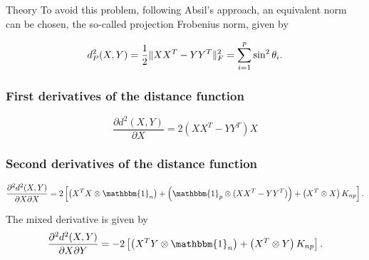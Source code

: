 \begin{chapter}{Theory}
To avoid this problem, following Absil's \cite{AbsilGrassmann} approach, an equivalent norm can be chosen, the so-called projection Frobenius norm, given by

\begin{equation}
    d_P^2(X,Y) = \frac{1}{2}\| XX^T-YY^T \|_{F}^{2} = \sum_{i=1}^p\sin^2\theta_i.
\end{equation}




\subsubsection{First derivatives of the distance function} %
\label{ssub:First derivatives of the distance function}

\begin{equation}
    \label{eq:gr_x_der}
    \frac{\partial d^2(X,Y)}{\partial X} = 2\left(XX^T-YY^T\right)X
\end{equation}



\subsubsection{Second derivatives of the distance function} %
\label{ssub:Second derivatives of the distance function}

\begin{equation}
    \label{eq:gr_xx_der}
    \frac{\partial^2 d^2(X,Y)}{\partial X\partial X} = 2
    \left[
	\left(X^TX\otimes \mathbbm{1}_{n}\right) 
	+ \left(\mathbbm{1}_p\otimes (XX^T-YY^T)\right)
	+ \left(X^T\otimes X\right)K_{np}
    \right].
\end{equation}

The mixed derivative is given by
\begin{equation}
    \label{eq:gr_xy_der}
    \frac{\partial^2 d^2(X,Y)}{\partial X\partial Y} = -2\left[\left(X^TY\otimes \mathbbm{1}_{n}\right) + \left(X^T\otimes Y\right)K_{np}\right].
\end{equation}







\end{chapter}
